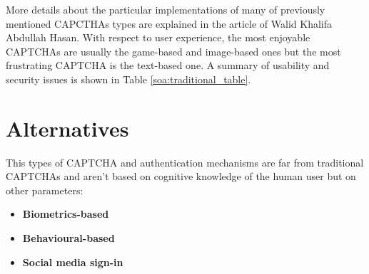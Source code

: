 More details about the particular implementations of many of previously mentioned CAPCTHAs types are explained in the article of Walid Khalifa Abdullah Hasan\cite{survey_advanced_CAPTCHA}. With respect to user experience, the most enjoyable CAPTCHAs are usually the game-based and image-based ones but the most frustrating CAPTCHA is the text-based one\cite{usability_CAPTCHA}. A summary of usability and security issues is shown in Table \ref{soa:traditional_table}.

\section{Alternatives}
This types of CAPTCHA and authentication mechanisms are far from traditional CAPTCHAs and aren't based on cognitive knowledge of the human user but on other parameters:
\begin{itemize}
\item{\textbf{Biometrics-based}\\
}
\item{\textbf{Behavioural-based}\\
}
\item{\textbf{Social media sign-in}\\
}
\end{itemize}

